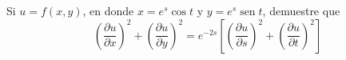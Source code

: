 \item Si $u = f(x, y)$, en donde $x = e^s \cos t$ y $y = e^s \operatorname{sen} t$, demuestre que
\[ \left( \frac{\partial u}{\partial x} \right)^2 + \left( \frac{\partial u}{\partial y} \right)^2 = e^{-2s} \left[ \left( \frac{\partial u}{\partial s} \right)^2 + \left( \frac{\partial u}{\partial t} \right)^2 \right] \]
